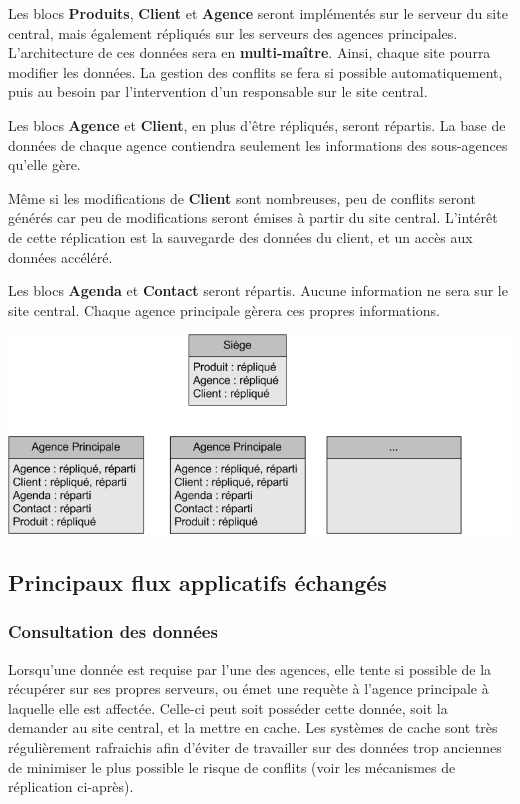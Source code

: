 Les blocs \textbf{Produits}, \textbf{Client} et \textbf{Agence} seront implémentés sur le serveur du site central, mais également répliqués sur les serveurs des agences principales. L'architecture de ces données sera en \textbf{multi-maître}. Ainsi, chaque site pourra modifier les données. La gestion des conflits se fera si possible automatiquement, puis au besoin par l'intervention d'un responsable sur le site central.

Les blocs \textbf{Agence} et \textbf{Client}, en plus d'être répliqués, seront répartis. La base de données de chaque agence contiendra seulement les informations des sous-agences qu'elle gère.

Même si les modifications de \textbf{Client} sont nombreuses, peu de conflits seront générés car peu de modifications seront émises à partir du site central. L'intérêt de cette réplication est la sauvegarde des données du client, et un accès aux données accéléré.

Les blocs \textbf{Agenda} et \textbf{Contact} seront répartis. Aucune information ne sera sur le site central. Chaque agence principale gèrera ces propres informations.

\begin {center}
\includegraphics[width=\textwidth]{repartition_bloc.png}
\end {center}

\subsection{Principaux flux applicatifs échangés}

\subsubsection{Consultation des données}

Lorsqu'une donnée est requise par l'une des agences, elle tente si possible de la récupérer sur ses
propres serveurs, ou émet une requète à l'agence principale à laquelle elle est affectée. Celle-ci
peut soit posséder cette donnée, soit la demander au site central, et la mettre en cache. Les systèmes
de cache sont très régulièrement rafraichis afin d'éviter de travailler sur des données trop anciennes
de minimiser le plus possible le risque de conflits (voir les mécanismes de réplication ci-après).

